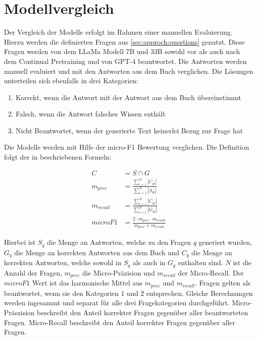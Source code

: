 \section{Modellvergleich}
Der Vergleich der Modelle erfolgt im Rahmen einer manuellen Evaluierung.
Hierzu werden die definierten Fragen aus \ref{sec:approch:questions} genutzt.
Diese Fragen werden von dem LLaMa Modell 7B und 33B sowohl vor als auch nach dem Continual Pretraining und von GPT-4 beantwortet.
Die Antworten werden manuell evaluiert und mit den Antworten aus dem Buch \citet{bb} verglichen.
Die Lösungen unterteilen sich ebenfalls in drei Kategorien:
\begin{enumerate}
    \item Korrekt, wenn die Antwort mit der Antwort aus dem Buch übereinstimmt
    \item Falsch, wenn die Antwort falsches Wissen enthält
    \item Nicht Beantwortet, wenn der generierte Text keinerlei Bezug zur Frage hat
\end{enumerate}

Die Modelle werden mit Hilfe der micro-F1 Bewertung verglichen.
Die Definition folgt der in \citet{chatgpt_qas} beschriebenen Formeln:
\begin{ceqn}
\begin{align}
    C &= S \cap G \\
    m_{prec} &= \frac{\sum_{i=1}^{N}|C_{qi}|}{\sum_{i=1}^{N}|S_{qi}|} \\
    m_{recall} &= \frac{\sum_{i=1}^{N}|C_{qi}|}{\sum_{i=1}^{N}|G_{qi}|} \\
    microF1 &= \frac{2 \cdot m_{prec} \cdot m_{recall}}{m_{prec} + m_{recall}}
\end{align}
\end{ceqn}
Hierbei ist $S_q$ die Menge an Antworten, welche zu den Fragen $q$ generiert wurden, $G_q$ die Menge an korrekten Antworten aus dem Buch \citet{bb} und $C_q$ die Menge an korrekten Antworten, welche sowohl in $S_q$ als auch in $G_q$ enthalten sind.
$N$ ist die Anzahl der Fragen, $m_{prec}$ die Micro-Präzision und $m_{recall}$ der Micro-Recall.
Der $microF1$ Wert ist das harmonische Mittel aus $m_{prec}$ und $m_{recall}$.
Fragen gelten als beantwortet, wenn sie den Kategorien 1 und 2 entsprechen.
Gleiche Berechnungen werden ingesammt und separat für alle drei Fragekategorien durchgeführt.
Micro-Präszision beschreibt den Anteil korrekter Fragen gegenüber aller beantworteten Fragen.
Micro-Recall beschreibt den Anteil korrekter Fragen gegenüber aller Fragen.\\

